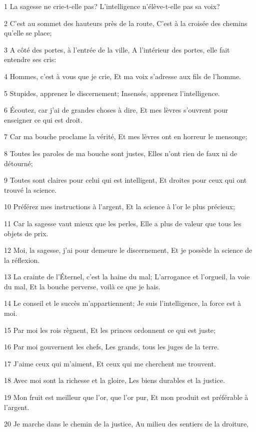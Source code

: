 \par 1 La sagesse ne crie-t-elle pas? L'intelligence n'élève-t-elle pas sa voix?
\par 2 C'est au sommet des hauteurs près de la route, C'est à la croisée des chemins qu'elle se place;
\par 3 A côté des portes, à l'entrée de la ville, A l'intérieur des portes, elle fait entendre ses cris:
\par 4 Hommes, c'est à vous que je crie, Et ma voix s'adresse aux fils de l'homme.
\par 5 Stupides, apprenez le discernement; Insensés, apprenez l'intelligence.
\par 6 Écoutez, car j'ai de grandes choses à dire, Et mes lèvres s'ouvrent pour enseigner ce qui est droit.
\par 7 Car ma bouche proclame la vérité, Et mes lèvres ont en horreur le mensonge;
\par 8 Toutes les paroles de ma bouche sont justes, Elles n'ont rien de faux ni de détourné;
\par 9 Toutes sont claires pour celui qui est intelligent, Et droites pour ceux qui ont trouvé la science.
\par 10 Préférez mes instructions à l'argent, Et la science à l'or le plus précieux;
\par 11 Car la sagesse vaut mieux que les perles, Elle a plus de valeur que tous les objets de prix.
\par 12 Moi, la sagesse, j'ai pour demeure le discernement, Et je possède la science de la réflexion.
\par 13 La crainte de l'Éternel, c'est la haine du mal; L'arrogance et l'orgueil, la voie du mal, Et la bouche perverse, voilà ce que je hais.
\par 14 Le conseil et le succès m'appartiennent; Je suis l'intelligence, la force est à moi.
\par 15 Par moi les rois règnent, Et les princes ordonnent ce qui est juste;
\par 16 Par moi gouvernent les chefs, Les grands, tous les juges de la terre.
\par 17 J'aime ceux qui m'aiment, Et ceux qui me cherchent me trouvent.
\par 18 Avec moi sont la richesse et la gloire, Les biens durables et la justice.
\par 19 Mon fruit est meilleur que l'or, que l'or pur, Et mon produit est préférable à l'argent.
\par 20 Je marche dans le chemin de la justice, Au milieu des sentiers de la droiture,
